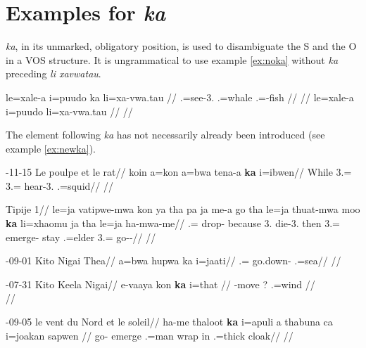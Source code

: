 \chapter{Examples for \textit{ka}} 
\label{Appendix_ka} 

\textit{ka}, in its unmarked, obligatory position, is used to disambiguate the S and the O in a VOS structure. It is ungrammatical to use example \ref{ex:noka} without \textit{ka} preceding \textit{li xavwatau}.

\pex
\a \label {ex:wifka}
\begingl
\gla le=xale-a i=puudo ka li=xa-vwa.tau	//
.=see-3.  .=whale .=-fish	//
\glft {}	//
\endgl 
\a \label{ex:noka}
\begingl
\gla *le=xale-a i=puudo li=xa-vwa.tau	//
\glft *	//
\endgl

\xe

The element following \textit{ka} has not necessarily already been introduced (see example \ref{ex:newka}).

\pex

\a \label{ex:newka}
\begingl
{}-11-15 Le poulpe et le rat//
\gla koin a=kon a=bwa tena-a \textbf{ka} i=ibwen//
\glb While 3.= 3.= hear-3.  .=squid//
\glft {}//
\endgl

\a
\begingl
\glpreamble Tipije 1//
\gla le=ja vatipwe-mwa kon ya tha pa ja me-a go tha le=ja thuat-mwa moo \textbf{ka} li=xhaomu ja tha le=ja ha-mwa-me// 
.= drop- because 3.    die-3. then  3.= emerge- stay  .=elder   3.= go--// 
\glft  {}// 
\endgl 



\a 
\begingl
{}-09-01 Kito Nigai Thea//
\gla a=bwa hupwa ka i=jaati//
.= go.down-  .=sea//
\glft {}//
\endgl

\a 
\begingl
{}-07-31 Kito Keela Nigai//
\gla	e-vaaya kon \textbf{ka} i=that	//
\glb	 {}-move ?  .=wind	//
\glft {}\\		//
\endgl

\a 
\begingl
{}-09-05 le vent du Nord et le soleil//
\gla	ha-me thaloot \textbf{ka} i=apuli a thabuna ca i=joakan sapwen	//
\glb	go- emerge  .=man  wrap in .=thick cloak//
\glft	{}//
\endgl

\xe